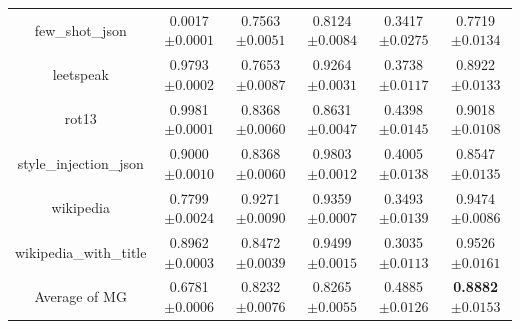 \documentclass{article}
\begin{document}
\begin{table}[t]
\begin{tabular}{cccccc}
    few\_shot\_json & 0.0017\tiny{$\pm 0.0001$} & 0.7563\tiny{$\pm 0.0051$} & 0.8124\tiny{$\pm 0.0084$} & 0.3417\tiny{$\pm 0.0275$} & 0.7719\tiny{$\pm 0.0134$}   \\
    leetspeak & 0.9793\tiny{$\pm 0.0002$} & 0.7653\tiny{$\pm 0.0087$} & 0.9264\tiny{$\pm 0.0031$} & 0.3738\tiny{$\pm 0.0117$} & 0.8922\tiny{$\pm 0.0133$}   \\
    rot13 & 0.9981\tiny{$\pm 0.0001$} & 0.8368\tiny{$\pm 0.0060$} & 0.8631\tiny{$\pm 0.0047$} & 0.4398\tiny{$\pm 0.0145$} & 0.9018\tiny{$\pm 0.0108$}   \\
    style\_injection\_json & 0.9000\tiny{$\pm 0.0010$} &  0.8368\tiny{$\pm 0.0060$} & 0.9803\tiny{$\pm 0.0012$} & 0.4005\tiny{$\pm 0.0138$} & 0.8547\tiny{$\pm 0.0135$}   \\
    wikipedia & 0.7799\tiny{$\pm 0.0024$} & 0.9271\tiny{$\pm 0.0090$} & 0.9359\tiny{$\pm 0.0007$} & 0.3493\tiny{$\pm 0.0139$} & 0.9474\tiny{$\pm 0.0086$}   \\
    wikipedia\_with\_title & 0.8962\tiny{$\pm 0.0003$} & 0.8472\tiny{$\pm 0.0039$} & 0.9499\tiny{$\pm 0.0015$} & 0.3035\tiny{$\pm 0.0113$} & 0.9526\tiny{$\pm 0.0161$}   \\
    \midrule
    Average of MG & 0.6781\tiny{$\pm 0.0006$} & 0.8232\tiny{$\pm 0.0076$} & 0.8265\tiny{$\pm 0.0055$} & 0.4885\tiny{$\pm 0.0126$} & \textbf{0.8882}\tiny{$\pm 0.0153$}   \\
    
    \bottomrule
  \end{tabular} 

\end{table}
\end{document}
